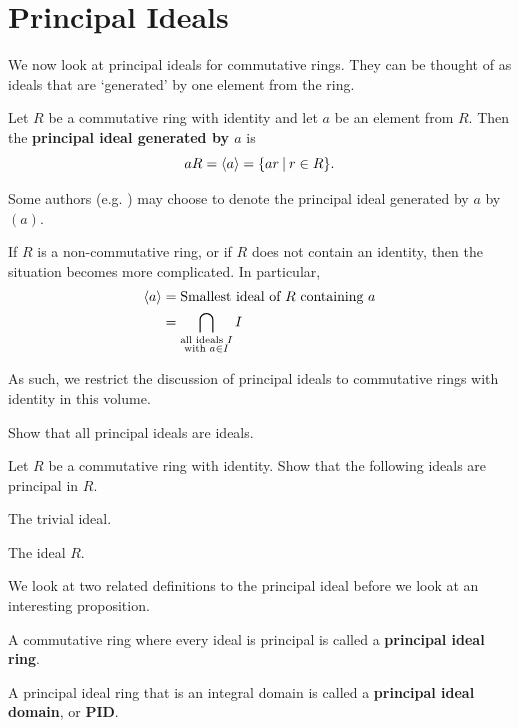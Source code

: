 \section{Principal Ideals}
We now look at principal ideals for commutative rings. They can be thought of as ideals that are `generated' by one element from the ring.
\begin{definition}
    Let $R$ be a commutative ring with identity and let $a$ be an element from $R$. Then the \textbf{principal ideal generated by $a$} is
    \[
        aR = \princ{a} = \{ar \vert r \in R\}.
    \]
\end{definition}
\begin{remark}
    Some authors (e.g. \cite[p.~251]{dummit_foote_2004}) may choose to denote the principal ideal generated by $a$ by $(a)$.
\end{remark}
\begin{remark}
    If $R$ is a non-commutative ring, or if $R$ does not contain an identity, then the situation becomes more complicated. In particular,
    \begin{align*}
        \left\langle a\right\rangle &= \text{Smallest ideal of } R \text{ containing }a\\
        &= \bigcap_{\substack{\text{all ideals }I \\ \text{with } a \in I}}I
    \end{align*}
    
    As such, we restrict the discussion of principal ideals to commutative rings with identity in this volume.
\end{remark}
\begin{exercise}
    Show that all principal ideals are ideals.
\end{exercise}
\begin{exercise}\label{exercise-trivial-ideal-and-whole-ring-are-principal-ideals}
    Let $R$ be a commutative ring with identity. Show that the following ideals are principal in $R$.
    \begin{partquestions}{\alph*}
        \item The trivial ideal.
        \item The ideal $R$.
    \end{partquestions}
\end{exercise}

We look at two related definitions to the principal ideal before we look at an interesting proposition.
\begin{definition}
    A commutative ring where every ideal is principal is called a \textbf{principal ideal ring}.
\end{definition}
\begin{definition}
    A principal ideal ring that is an integral domain is called a \textbf{principal ideal domain}, or \textbf{PID}.
\end{definition}

